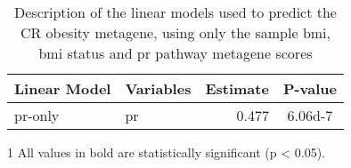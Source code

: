 \begin{table}[htpb]
	\centering
	\caption{Description of the linear models used to predict the CR obesity metagene, using only the sample \gls{bmi}, \gls{bmi} status and \gls{pr} pathway metagene scores}
	\label{tab:lm_pr_only}
	\begin{threeparttable}
			\begin{tabular}{llrS[detect-weight]}
				Linear Model & Variables & Estimate &P-value\\
				\hline
				\hline
				\rule{0pt}{2.25ex}\gls{pr}-only & \gls{pr}   & 0.477  & {\num{6.06d-7}}\\
			\end{tabular}
			\begin{tablenotes}
				\item [1] All values in bold are statistically significant (p \textless{} 0.05).
			\end{tablenotes}
	\end{threeparttable}
\end{table}
